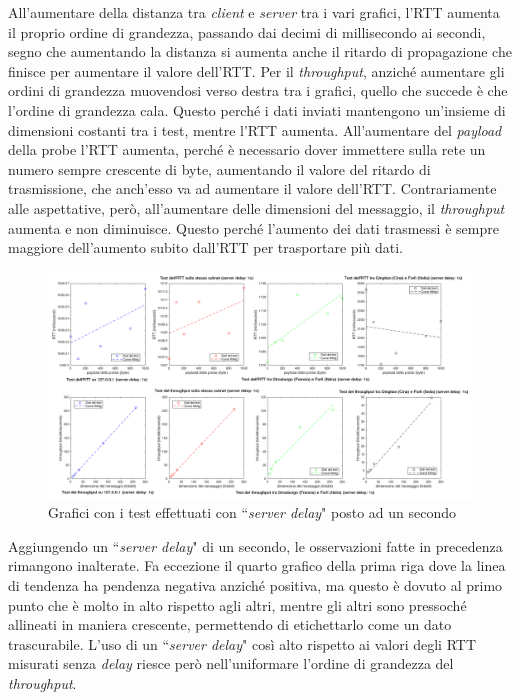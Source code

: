 \documentclass[a4paper, 12pt]{report}
\begin{document}
All'aumentare della distanza tra \textit{client} e \textit{server} tra i vari grafici, l'RTT aumenta il proprio ordine di grandezza, passando
dai decimi di millisecondo ai secondi, segno che aumentando la distanza si aumenta anche il ritardo di propagazione che finisce per aumentare il
valore dell'RTT.\newline
Per il \textit{throughput}, anziché aumentare gli ordini di grandezza muovendosi verso destra tra i grafici, quello che succede è che l'ordine
di grandezza cala. Questo perché i dati inviati mantengono un'insieme di dimensioni costanti tra i test, mentre l'RTT aumenta.\newline
All'aumentare del \textit{payload} della probe l'RTT aumenta, perché è necessario dover immettere sulla rete un numero sempre 
crescente di byte, aumentando il valore del ritardo di trasmissione, che anch'esso va ad aumentare il valore dell'RTT.\newline
Contrariamente alle aspettative, però, all'aumentare delle dimensioni del messaggio, il \textit{throughput} aumenta e non diminuisce. Questo perché
l'aumento dei dati trasmessi è sempre maggiore dell'aumento subito dall'RTT per trasportare più dati.

\begin{figure}[H]
	\centering
	\includegraphics[width=\linewidth]{images/delay.png}
	\caption{Grafici con i test effettuati con ``\textit{server delay}" posto ad un secondo}
\end{figure}

Aggiungendo un ``\textit{server delay}" di un secondo, le osservazioni fatte in precedenza rimangono inalterate. Fa eccezione il quarto grafico della
prima riga dove la linea di tendenza ha pendenza negativa anziché positiva, ma questo è dovuto al primo punto che è molto in alto rispetto
agli altri, mentre gli altri sono pressoché allineati in maniera crescente, permettendo di etichettarlo come un dato trascurabile.\newline
L'uso di un ``\textit{server delay}" così alto rispetto ai valori degli RTT misurati senza \textit{delay} riesce però nell'uniformare l'ordine di grandezza 
del \textit{throughput}.
\end{document}
